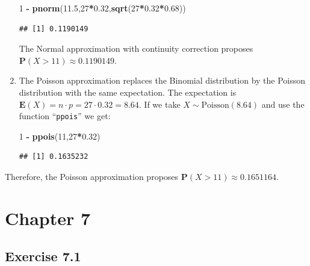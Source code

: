 \documentclass[
]{krantz}
\makeatletter
\newenvironment{Shaded}{\begin{snugshade}}{\end{snugshade}}
\newcommand{\DecValTok}[1]{\textcolor[rgb]{0.00,0.00,0.81}{#1}}
\newcommand{\FloatTok}[1]{\textcolor[rgb]{0.00,0.00,0.81}{#1}}
\newcommand{\KeywordTok}[1]{\textcolor[rgb]{0.13,0.29,0.53}{\textbf{#1}}}
\newcommand{\NormalTok}[1]{#1}
\newcommand{\OperatorTok}[1]{\textcolor[rgb]{0.81,0.36,0.00}{\textbf{#1}}}
\newcommand{\StringTok}[1]{\textcolor[rgb]{0.31,0.60,0.02}{#1}}
\newcommand{\Expec}{\mathbf{E}}
\newcommand{\Prob}{\mathbf{P}}
\newenvironment{kframe}{%
\medskip{}
\setlength{\fboxsep}{.8em}
 \def\at@end@of@kframe{}%
 \ifinner\ifhmode%
  \def\at@end@of@kframe{\end{minipage}}%
  \begin{minipage}{\columnwidth}%
 \fi\fi%
 \def\FrameCommand##1{\hskip\@totalleftmargin \hskip-\fboxsep
 \colorbox{shadecolor}{##1}\hskip-\fboxsep
     \hskip-\linewidth \hskip-\@totalleftmargin \hskip\columnwidth}%
 \MakeFramed {\advance\hsize-\width
   \@totalleftmargin\z@ \linewidth\hsize
   \@setminipage}}%
 {\par\unskip\endMakeFramed%
 \at@end@of@kframe}
\renewenvironment{Shaded}{\begin{kframe}}{\end{kframe}}
\theoremstyle{definition}
\theoremstyle{definition}
\theoremstyle{definition}
\theoremstyle{remark}
\makeatother
\begin{document}
\begin{enumerate}
\begin{Shaded}
\begin{Highlighting}[]
\DecValTok{1} \OperatorTok{-}\StringTok{ }\KeywordTok{pnorm}\NormalTok{(}\FloatTok{11.5}\NormalTok{,}\DecValTok{27}\OperatorTok{*}\FloatTok{0.32}\NormalTok{,}\KeywordTok{sqrt}\NormalTok{(}\DecValTok{27}\OperatorTok{*}\FloatTok{0.32}\OperatorTok{*}\FloatTok{0.68}\NormalTok{))}
\end{Highlighting}
\end{Shaded}

\begin{verbatim}
## [1] 0.1190149
\end{verbatim}

  The Normal approximation with continuity correction proposes
  \(\Prob(X > 11) \approx 0.1190149\).
\item
  The Poisson approximation replaces the
  Binomial distribution by the Poisson distribution with the same
  expectation. The expectation is
  \(\Expec(X) = n \cdot p = 27 \cdot 0.32 = 8.64\). If we take
  \(X \sim \mbox{Poisson}(8.64)\) and use the function ``\texttt{ppois}'' we get:

\begin{Shaded}
\begin{Highlighting}[]
\DecValTok{1} \OperatorTok{-}\StringTok{ }\KeywordTok{ppois}\NormalTok{(}\DecValTok{11}\NormalTok{,}\DecValTok{27}\OperatorTok{*}\FloatTok{0.32}\NormalTok{)}
\end{Highlighting}
\end{Shaded}

\begin{verbatim}
## [1] 0.1635232
\end{verbatim}
\end{enumerate}

Therefore, the Poisson approximation proposes
\(\Prob(X > 11) \approx 0.1651164\).

\hypertarget{chapter-7}{%
\section*{Chapter 7}\label{chapter-7}}


\hypertarget{exercise-7.1}{%
\subsection*{Exercise 7.1}\label{exercise-7.1}}
\end{document}
